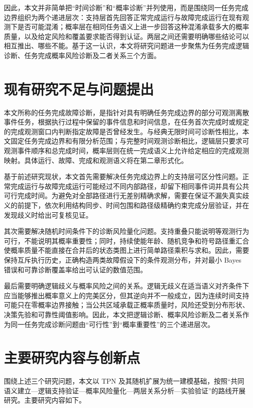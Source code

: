 \documentclass[master,fontset=ubuntu]{shnuthesis}
\theoremstyle{definition}
\begin{document}
因此，本文并非简单把“时间诊断”和“概率诊断”并列使用，而是围绕同一任务完成边界组织为两个递进层次：支持层首先回答正常完成运行与故障完成运行在现有观测下是否可能混淆；概率层在相同任务语义上进一步回答这种混淆承载多大的概率质量，以及给定风险和覆盖要求能否得到认证。两层之间还需要明确哪些结论可以相互推出、哪些不能。基于这一认识，本文将研究问题进一步聚焦为任务完成逻辑诊断、任务完成概率风险诊断及二者关系三个方面。

\section{现有研究不足与问题提出}

本文所称的任务完成故障诊断，是指针对具有明确任务完成边界的部分可观测离散事件任务，根据执行过程中保留的事件信息和时间信息，在任务首次完成时或规定的完成观测窗口内判断指定故障是否曾经发生。与经典无限时间可诊断性相比，本文固定任务完成边界和有限分析范围；与完整时间观测诊断相比，逻辑层只要求可观测事件顺序和总完成时间，概率层则在统一完成语义上允许给定相应的完成观测映射。具体运行、故障、完成和观测语义将在第二章形式化。

基于前述研究现状，本文首先需要解决任务完成边界上的支持层可区分性问题。正常完成运行与故障完成运行可能经过不同内部路径，却留下相同事件词并具有公共可行完成时间。为避免对全部路径进行无差别精确求解，需要在保证不漏失真实歧义的前提下，依次利用结构同步、时间包围和路径级精确约束完成分层验证，并在发现歧义时给出可复核见证。

其次需要解决随机时间条件下的诊断风险量化问题。支持重叠只能说明等观测行为可行，不能说明其概率重要性；同时，持续使能年龄、随机竞争和符号路径重汇合使概率质量不能直接在合并后的状态类图上进行简单路径乘积与求和。因此，需要保持互斥执行历史，正确构造两类故障假设下的条件观测分布，并对最小 Bayes 错误和可靠诊断覆盖率给出可认证的数值范围。

最后需要明确逻辑歧义与概率风险之间的关系。逻辑无歧义在适当语义对齐条件下应当能够推出概率意义上的完美区分，但其逆向并不一般成立，因为连续时间支持可能只在零概率边界接触；当公共区域承载正概率质量时，风险还受到分布形状、决策先验和可靠性阈值影响。因此，本文把逻辑诊断、概率风险诊断及二者关系作为同一任务完成诊断问题由“可行性”到“概率重要性”的三个递进层次。

\section{主要研究内容与创新点}

围绕上述三个研究问题，本文以 TPN 及其随机扩展为统一建模基础，按照“共同语义建立---逻辑支持验证---概率风险量化---两层关系分析---实验验证”的路线开展研究。主要研究内容如下。
\end{document}
